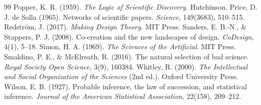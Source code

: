 \documentclass[11pt,a4paper]{article}
\begin{document}
\begin{thebibliography}{99}
 Popper, K. R. (1959). \emph{The Logic of Scientific Discovery}. Hutchinson.
 Price, D. J. de Solla (1965). Networks of scientific papers. \emph{Science}, 149(3683), 510--515.
 Redström, J. (2017). \emph{Making Design Theory}. MIT Press.
 Sanders, E. B.-N., \& Stappers, P. J. (2008). Co-creation and the new landscapes of design. \emph{CoDesign}, 4(1), 5--18.
 Simon, H. A. (1969). \emph{The Sciences of the Artificial}. MIT Press.
 Smaldino, P. E., \& McElreath, R. (2016). The natural selection of bad science. \emph{Royal Society Open Science}, 3(9), 160384.
 Whitley, R. (2000). \emph{The Intellectual and Social Organization of the Sciences} (2nd ed.). Oxford University Press.
 Wilson, E. B. (1927). Probable inference, the law of succession, and statistical inference. \emph{Journal of the American Statistical Association}, 22(158), 209--212.
\end{thebibliography}
\end{document}
